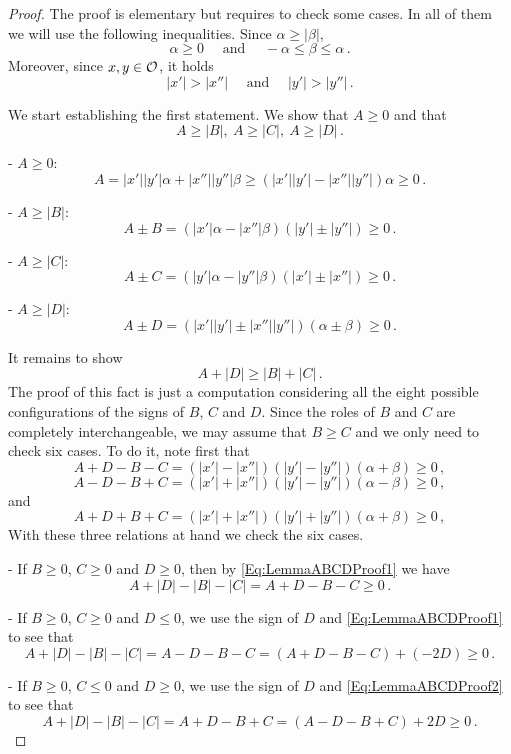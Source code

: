\begin{proof} The proof is elementary but requires to check some cases. In all of them we will use the following inequalities. Since $\alpha \geq |\beta |$,
$$
\alpha\geq 0 \quad \textrm{ and } \quad  -\alpha \leq \beta \leq \alpha\,.
$$
Moreover, since $x,y\in\mathcal{O}$, it holds
$$
|x'|>|x''| \quad \textrm{ and } \quad |y'|>|y''|\,.
$$


We start establishing the first statement. We show that $A\geq 0$ and that
$$
A \geq |B|, \ A \geq |C| ,\ A \geq |D|\,.
$$


- $A \geq 0$:
$$
 A =  |x'||y'|  \alpha + |x''||y''|\beta \geq (|x'||y'|  - |x''||y''|)\alpha \geq 0\,.
$$

- $A \geq |B|$:
$$
A\pm B = (|x'|\alpha-|x''|\beta)(|y'|\pm |y''|) \geq 0\,.
$$

- $A \geq |C|$:
$$
A\pm C = (|y'|\alpha-|y''|\beta)(|x'|\pm |x''|)  \geq 0\,.
$$

- $A \geq |D|$:
$$
A\pm D = (|x'||y'| \pm |x''||y''|)(\alpha \pm \beta) \geq 0\,.
$$


It remains to show
$$
A + |D| \geq |B| + |C|\,.
$$
The proof of this fact is just a computation considering all the eight possible configurations of
the signs of $B$, $C$ and $D$. Since the roles of $B$ and $C$ are completely interchangeable, we
may assume that $B \geq C$ and we only need to check six cases. To do it, note first that
\begin{equation}
\label{Eq:LemmaABCDProof1}
A + D - B - C = (|x'|-|x''|)(|y'|-|y''|)(\alpha + \beta) \geq 0 \,,
\end{equation}
\begin{equation}
\label{Eq:LemmaABCDProof2}
A - D - B + C = (|x'|+|x''|)(|y'|-|y''|)(\alpha - \beta) \geq 0 \,,
\end{equation}
and
\begin{equation}
\label{Eq:LemmaABCDProof3}
A + D + B + C = (|x'|+|x''|)(|y'|+|y''|)(\alpha + \beta) \geq 0 \,,
\end{equation}
With these three relations at hand we check the six cases.

- If $B \geq 0$, $C \geq 0$ and $D \geq 0$, then by \eqref{Eq:LemmaABCDProof1} we have
$$
A + |D| - |B| - |C| = A + D - B - C \geq 0\,.
$$

- If $B \geq 0$, $C \geq 0$ and $D \leq 0$, we use the sign of $D$ and \eqref{Eq:LemmaABCDProof1} to
see that
$$
A + |D| - |B| - |C| = A - D - B - C =  (A + D - B - C) + (-2D) \geq 0\,.
$$

- If $B \geq 0$, $C \leq 0$ and $D \geq 0$, we use the sign of $D$ and \eqref{Eq:LemmaABCDProof2} to
see that
$$
A + |D| - |B| - |C| = A + D - B + C =  (A - D - B + C) + 2D \geq 0\,.
$$


\end{proof}
